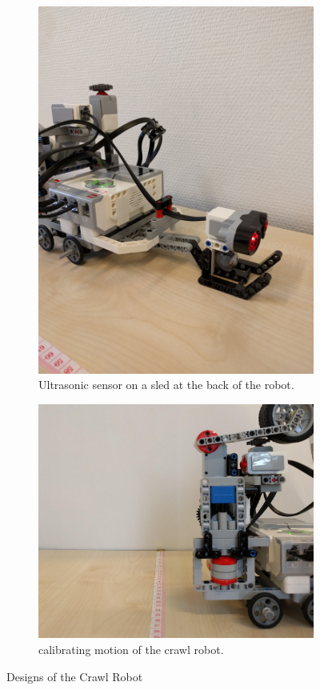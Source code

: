 \documentclass[11pt, a4paper]{article}
\begin{document}
\begin{figure}
	\centering

	\begin{subfigure}{.4\textwidth}
		\centering
		\includegraphics[width=0.8\linewidth]{images/crawl_sled}
		\caption{Ultrasonic sensor on a sled at the back of the robot.}
		\label{fig:sub2}
	\end{subfigure}
	\begin{subfigure}{.4\textwidth}
		\centering
		\includegraphics[width=1\linewidth]{images/crawl_calibrate}
		\caption{calibrating motion of the crawl robot.}
		\label{fig:sub1}
	\end{subfigure}%
	\caption{Designs of the Crawl Robot}
	\label{fig:test}
\end{figure}
\end{document}
